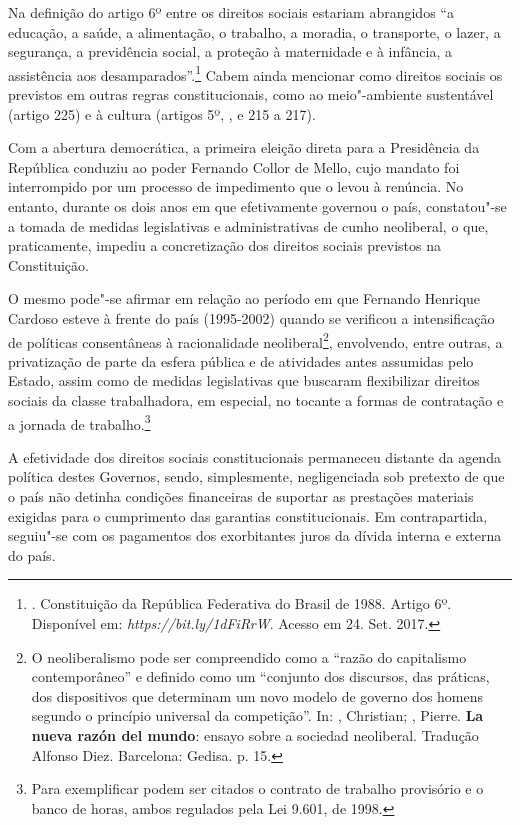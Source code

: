 Na definição do artigo 6º entre os direitos sociais estariam abrangidos
``a educação, a saúde, a alimentação, o trabalho, a moradia, o
transporte, o lazer, a segurança, a previdência social, a proteção à
maternidade e à infância, a assistência aos desamparados''.\footnote{.
  Constituição da República Federativa do Brasil de 1988. Artigo 6º.
  Disponível em: \emph{https://bit.ly/1dFiRrW}.
  Acesso em 24. Set. 2017.} Cabem ainda mencionar como direitos sociais
os previstos em outras regras constitucionais, como ao meio"-ambiente
sustentável (artigo 225) e à cultura (artigos 5º, , e 215 a 217).

Com a abertura democrática, a primeira eleição direta para a Presidência
da República conduziu ao poder Fernando Collor de Mello, cujo mandato
foi interrompido por um processo de impedimento que o levou à renúncia.
No entanto, durante os dois anos em que efetivamente governou o país,
constatou"-se a tomada de medidas legislativas e administrativas de cunho
neoliberal, o que, praticamente, impediu a concretização dos direitos
sociais previstos na Constituição.

O mesmo pode"-se afirmar em relação ao período em que Fernando Henrique
Cardoso esteve à frente do país (1995-2002) quando se verificou a
intensificação de políticas consentâneas à racionalidade
neoliberal\footnote{O neoliberalismo pode ser compreendido como a
  ``razão do capitalismo contemporâneo'' e definido como um ``conjunto
  dos discursos, das práticas, dos dispositivos que determinam um novo
  modelo de governo dos homens segundo o princípio universal da
  competição''. In: , Christian; , Pierre. \textbf{La nueva
  razón del mundo}: ensayo sobre a sociedad neoliberal. Tradução Alfonso
  Diez. Barcelona: Gedisa. p. 15.}, envolvendo, entre outras, a
privatização de parte da esfera pública e de atividades antes assumidas
pelo Estado, assim como de medidas legislativas que buscaram
flexibilizar direitos sociais da classe trabalhadora, em especial, no
tocante a formas de contratação e a jornada de trabalho.\footnote{Para
  exemplificar podem ser citados o contrato de trabalho provisório e o
  banco de horas, ambos regulados pela Lei 9.601, de 1998.}

A efetividade dos direitos sociais constitucionais permaneceu distante
da agenda política destes Governos, sendo, simplesmente, negligenciada
sob pretexto de que o país não detinha condições financeiras de suportar
as prestações materiais exigidas para o cumprimento das garantias
constitucionais. Em contrapartida, seguiu"-se com os pagamentos dos
exorbitantes juros da dívida interna e externa do país.

